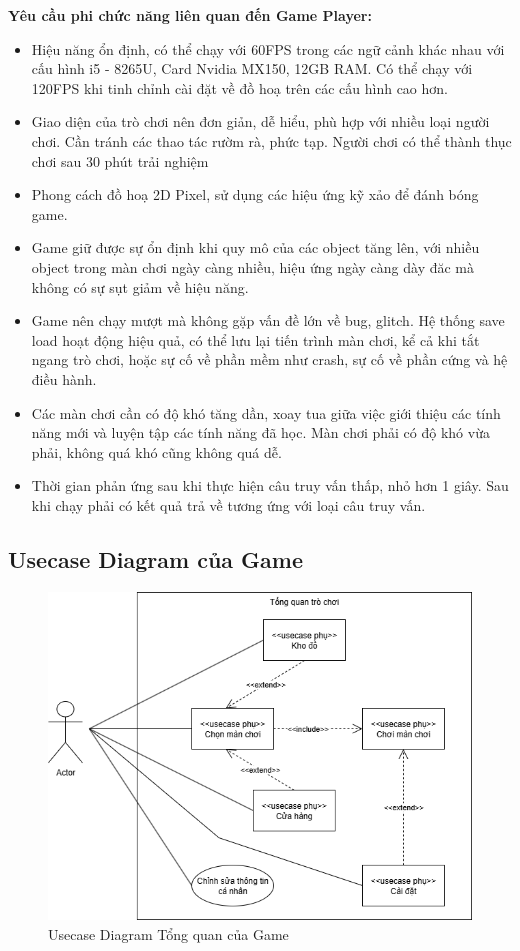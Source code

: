 \textbf{Yêu cầu phi chức năng liên quan đến Game Player:}
\begin{itemize}
	\item Hiệu năng ổn định, có thể chạy với 60FPS trong các ngữ cảnh khác nhau với cấu hình i5 - 8265U, Card Nvidia MX150, 12GB RAM. Có thể chạy với 120FPS khi tinh chỉnh cài đặt về đồ hoạ trên các cấu hình cao hơn.
	\item Giao diện của trò chơi nên đơn giản, dễ hiểu, phù hợp với nhiều loại người chơi. Cần tránh các thao tác rườm rà, phức tạp.
	Người chơi có thể thành thục chơi sau 30 phút trải nghiệm
	\item Phong cách đồ hoạ 2D Pixel, sử dụng các hiệu ứng kỹ xảo để đánh bóng game.
	\item Game giữ được sự ổn định khi quy mô của các object tăng lên, với nhiều object trong màn chơi ngày càng nhiều, hiệu ứng ngày càng dày đăc mà không có sự sụt giảm về hiệu năng.
	\item Game nên chạy mượt mà không gặp vấn đề lớn về bug, glitch. Hệ thống save load hoạt động hiệu quả, có thể lưu lại tiến trình màn chơi, kể cả khi tắt ngang trò chơi, hoặc sự cố về phần mềm như crash, sự cố về phần cứng và hệ điều hành.
	\item Các màn chơi cần có độ khó tăng dần, xoay tua giữa việc giới thiệu các tính năng mới và luyện tập các tính năng đã học. Màn chơi phải có độ khó vừa phải, không quá khó cũng không quá dễ.
	\item Thời gian phản ứng sau khi thực hiện câu truy vấn thấp, nhỏ hơn 1 giây. Sau khi chạy phải có kết quả trả về tương ứng với loại câu truy vấn.
\end{itemize}
\subsection{Usecase Diagram của Game}
\begin{figure}[H]
	\centering
	\includegraphics[width=14cm]{Images/overallUCD.png}
	\vspace{0.5cm}
	\caption{Usecase Diagram Tổng quan của Game}
\end{figure}

